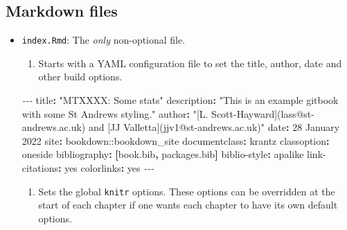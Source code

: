 \documentclass[
  british,
  oneside]{krantz}
\newenvironment{Shaded}{\begin{snugshade}}{\end{snugshade}}
\newcommand{\AttributeTok}[1]{\textcolor[rgb]{0.77,0.63,0.00}{#1}}
\newcommand{\CharTok}[1]{\textcolor[rgb]{0.31,0.60,0.02}{#1}}
\newcommand{\FunctionTok}[1]{\textcolor[rgb]{0.00,0.00,0.00}{#1}}
\newcommand{\KeywordTok}[1]{\textcolor[rgb]{0.13,0.29,0.53}{\textbf{#1}}}
\newcommand{\PreprocessorTok}[1]{\textcolor[rgb]{0.56,0.35,0.01}{\textit{#1}}}
\newcommand{\StringTok}[1]{\textcolor[rgb]{0.31,0.60,0.02}{#1}}
\providecommand{\tightlist}{%
  \setlength{\itemsep}{0pt}\setlength{\parskip}{0pt}}
\theoremstyle{definition}
\theoremstyle{definition}
\theoremstyle{definition}
\theoremstyle{definition}
\theoremstyle{remark}
\begin{document}
\hypertarget{markdown-files}{%
\subsection*{Markdown files}\label{markdown-files}}


\begin{itemize}
\item
  \texttt{index.Rmd}: The \emph{only} non-optional file.

  \begin{enumerate}
  \def\labelenumi{\arabic{enumi}.}
  \tightlist
  \item
    Starts with a YAML configuration file to set the title, author, date and other build options.
  \end{enumerate}

\begin{Shaded}
\begin{Highlighting}[]
\PreprocessorTok{{-}{-}{-} }
\FunctionTok{title}\KeywordTok{:}\AttributeTok{ }\StringTok{"MTXXXX: Some stats"}
\FunctionTok{description}\KeywordTok{:}\AttributeTok{ }\StringTok{"This is an example gitbook with some St Andrews styling."}
\FunctionTok{author}\KeywordTok{:}\AttributeTok{ }\StringTok{"[L. Scott{-}Hayward](lass@st{-}andrews.ac.uk) and [JJ Valletta](jjv1@st{-}andrews.ac.uk)"}
\FunctionTok{date}\KeywordTok{:}\AttributeTok{ }\StringTok{\textquotesingle{}28 January 2022\textquotesingle{}}
\FunctionTok{site}\KeywordTok{:}\AttributeTok{ bookdown::bookdown\_site}
\FunctionTok{documentclass}\KeywordTok{:}\AttributeTok{ krantz}
\FunctionTok{classoption}\KeywordTok{:}\AttributeTok{ oneside}
\FunctionTok{bibliography}\KeywordTok{:}\AttributeTok{ }\KeywordTok{[}\AttributeTok{book.bib}\KeywordTok{,}\AttributeTok{ packages.bib}\KeywordTok{]}
\FunctionTok{biblio{-}style}\KeywordTok{:}\AttributeTok{ apalike}
\FunctionTok{link{-}citations}\KeywordTok{:}\AttributeTok{ }\CharTok{yes}
\FunctionTok{colorlinks}\KeywordTok{:}\AttributeTok{ }\CharTok{yes}
\PreprocessorTok{{-}{-}{-}}
\end{Highlighting}
\end{Shaded}

  \begin{enumerate}
  \def\labelenumi{\arabic{enumi}.}
  \setcounter{enumi}{1}
  \tightlist
  \item
    Sets the global \texttt{knitr} options. These options can be overridden at the start of each chapter if one wants each chapter to have its own default options.
  \end{enumerate}


\end{itemize}
\end{document}
